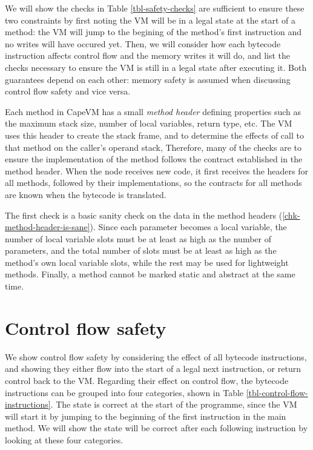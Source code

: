 We will show the checks in Table \ref{tbl-safety-checks} are sufficient to ensure these two constraints by first noting the VM will be in a legal state at the start of a method: the VM will jump to the begining of the method's first instruction and no writes will have occured yet. Then, we will consider how each bytecode instruction affects control flow and the memory writes it will do, and list the checks necessary to ensure the VM is still in a legal state after executing it. Both guarantees depend on each other: memory safety is assumed when discussing control flow safety and vice versa.

Each method in CapeVM has a small \emph{method header} defining properties such as the maximum stack size, number of local variables, return type, etc. The VM uses this header to create the stack frame, and to determine the effects of call to that method on the caller's operand stack, Therefore, many of the checks are to ensure the implementation of the method follows the contract established in the method header. When the node receives new code, it first receives the headers for all methods, followed by their implementations, so the contracts for all methods are known when the bytecode is translated.

The first check is a basic sanity check on the data in the method headers (\ref{chk-method-header-is-sane}). Since each parameter becomes a local variable, the number of local variable slots must be at least as high as the number of parameters, and the total number of slots must be at least as high as the method's own local variable slots, while the rest may be used for lightweight methods. Finally, a method cannot be marked static and abstract at the same time.

\section{Control flow safety}
We show control flow safety by considering the effect of all bytecode instructions, and showing they either flow into the start of a legal next instruction, or return control back to the VM. Regarding their effect on control flow, the bytecode instructions can be grouped into four categories, shown in Table \ref{tbl-control-flow-instructions}. The state is correct at the start of the programme, since the VM will start it by jumping to the beginning of the first instruction in the main method. We will show the state will be correct after each following instruction by looking at these four categories.

